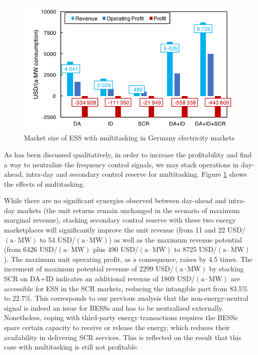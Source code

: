\begin{figure}[h!]
	\centering
	\includegraphics[width=0.95\linewidth]{Figures/Germany_ESS_multitasking}
	\caption{Market size of ESS with multitasking in Germany electricity markets}
	\label{fig:germany-ess-multitasking}
\end{figure}

As has been discussed qualitatively, in order to increase the profitability and find a way to neutralize the frequency control signals, we may stack operations in day-ahead, intra-day and secondary control reserve for multitasking. Figure \ref{fig:germany-ess-multitasking} shows the effects of multitasking.

While there are no significant synergies observed between day-ahead and intra-day markets (the unit returns remain unchanged in the scenario of maximum marginal revenue), stacking secondary control reserve with these two energy marketplaces will significantly improve the unit revenue (from 11 and 22 USD/$(\text{a} \cdot \text{MW})$ to 54 USD/$(\text{a} \cdot \text{MW})$) as well as the maximum revenue potential (from \num{6426} USD/$(\text{a} \cdot \text{MW})$ plus \num{490} USD/$(\text{a} \cdot \text{MW})$ to \num{8725} USD/$(\text{a} \cdot \text{MW})$). The maximum unit operating profit, as a consequence, raises by 4.5 times. The increment of maximum potential revenue of \num{2299} USD/$(\text{a} \cdot \text{MW})$ by stacking SCR on DA+ID indicates an additional revenue of \num{1809} USD/$(\text{a} \cdot \text{MW})$ are accessible for ESS in the SCR markets, reducing the intangible part from 83.5\% to 22.7\%. This corresponds to our previous analysis that the non-energy-neutral signal is indeed an issue for BESSs and has to be neutralized externally. Nonetheless, coping with third-party energy transactions requires the BESSs spare certain capacity to receive or release the energy, which reduces their availability in delivering SCR services. This is reflected on the result that this case with multitasking is still not profitable.

